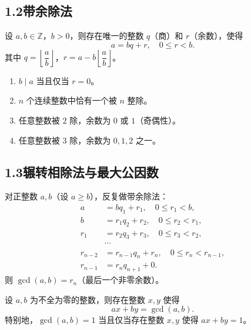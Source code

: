 \documentclass[12pt, a4paper]{ctexart}
\begin{document}
\subsection*{1.2\quad 带余除法}

\begin{knowledgebox}[带余除法定理]
设 $a, b \in \mathbb{Z}$，$b > 0$，则存在唯一的整数 $q$（商）和 $r$（余数），使得
\[ a = bq + r, \quad 0 \leqslant r < b. \]
其中 $q = \left\lfloor \dfrac{a}{b} \right\rfloor$，$r = a - b\left\lfloor \dfrac{a}{b} \right\rfloor$。
\end{knowledgebox}

\begin{tipbox}[关键推论]
\begin{enumerate}[label=(\arabic*)]
  \item $b \mid a$ 当且仅当 $r = 0$。
  \item $n$ 个连续整数中恰有一个被 $n$ 整除。
  \item 任意整数被 $2$ 除，余数为 $0$ 或 $1$（奇偶性）。
  \item 任意整数被 $3$ 除，余数为 $0, 1, 2$ 之一。
\end{enumerate}
\end{tipbox}

\subsection*{1.3\quad 辗转相除法与最大公因数}

\begin{knowledgebox}
对正整数 $a, b$（设 $a \geqslant b$），反复做带余除法：
\begin{align*}
a &= bq_1 + r_1, \quad 0 \leqslant r_1 < b, \\
b &= r_1 q_2 + r_2, \quad 0 \leqslant r_2 < r_1, \\
r_1 &= r_2 q_3 + r_3, \quad 0 \leqslant r_3 < r_2, \\
&\cdots \\
r_{n-2} &= r_{n-1} q_n + r_n, \quad 0 \leqslant r_n < r_{n-1}, \\
r_{n-1} &= r_n q_{n+1} + 0.
\end{align*}
则 $\gcd(a, b) = r_n$（最后一个非零余数）。
\end{knowledgebox}

\begin{knowledgebox}
设 $a, b$ 为不全为零的整数，则存在整数 $x, y$ 使得
\[ ax + by = \gcd(a, b). \]
特别地，$\gcd(a, b) = 1$ 当且仅当存在整数 $x, y$ 使得 $ax + by = 1$。
\end{knowledgebox}
\end{document}

